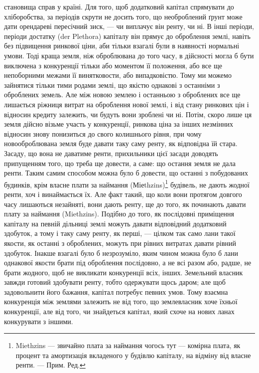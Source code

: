 \parcont{}  %
становища справ у країні. Для того, щоб додатковий капітал спрямувати до
хліборобства, за періодів скрути не досить того, що необроблений ґрунт може
дати орендареві пересічний зиск, — чи виплачує він ренту, чи ні. В інші періоди,
періоди достатку (der Plethora) капіталу він прямує до оброблення землі, навіть
без підвищення ринкової ціни, аби тільки взагалі були в наявності нормальні
умови. Тоді краща земля, ніж оброблювана до того часу, в дійсності могла б
бути виключена з конкуренції тільки або моментом її положення, або все ще
непоборними межами її винятковости, або випадковістю. Тому ми можемо зайнятися
тільки тими родами землі, що якістю однакові з останніми з оброблених
земель. Але між новою землею і останньою з оброблених все ще лишається
ріжниця витрат на оброблення нової землі, і від стану ринкових цін і відносин
кредиту залежить, чи будуть вони зроблені чи ні. Потім, скоро лише ця земля
дійсно візьме участь у конкуренції, ринкова ціна за інших незмінних відносин
знову понизиться до свого колишнього рівня, при чому новооброблювана земля
буде давати таку саму ренту, як відповідна їй стара. Засаду, що вона не даватиме
ренти, прихильники цієї засади доводять припущенням того, що треба ще довести,
а саме: що остання земля не дала ренти. Таким самим способом можна було б довести,
що останні з побудованих будинків, крім власне плати за наймання (Міеthzins)\footnote*{
Miethzins — звичайно плата за наймання чогось тут — комірна плата, як процент та амортизація
вкладеного у будівлю капіталу, на відміну від власне ренти. — Прим. Ред.
}
будівель, не дають жодної ренти, хоч і винаймається їх. Але факт такий,
що коли вони протягом довгого часу лишаються незайняті, вони дають ренту, ще
до того, як починають давати плату за наймання (Miethzins). Подібно до того,
як послідовні приміщення капіталу на певній дільниці землі можуть давати
відповідний додатковий здобуток, а тому і таку саму ренту, як перші, — цілком
так само лани такої якости, як останні з оброблених, можуть при рівних витратах
давати рівний здобуток. Інакше взагалі було б незрозуміло, яким чином
можна було б лани однакової якости брати під оброблення послідовно, а не
всі разом або, радше, не брати жодного, щоб не викликати конкуренції всіх,
інших. Земельний власник завжди готовий здобувати ренту, тобто одержувати
щось даром; але щоб задовольнити його бажання, капітал потребує певних
умов. Тому взаємна конкуренція між землями залежить не від того, що землевласник
хоче їхньої конкуренції, але від того, чи знайдеться капітал, який
схоче на нових ланах конкурувати з іншими.

